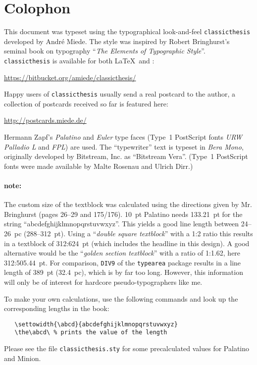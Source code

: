 \pagestyle{empty}

\hfill

\vfill


\section*{Colophon}
This document was typeset using the typographical look-and-feel \texttt{classicthesis} developed by Andr\'e Miede. 
The style was inspired by Robert Bringhurst's seminal book on typography ``\emph{The Elements of Typographic Style}''. 
\texttt{classicthesis} is available for both \LaTeX\ and \mLyX: 
\begin{center}
\url{https://bitbucket.org/amiede/classicthesis/}
\end{center}
Happy users of \texttt{classicthesis} usually send a real postcard to the author, a collection of postcards received so far is featured here: 
\begin{center}
\url{http://postcards.miede.de/}
\end{center}
 
\bigskip

\noindent\finalVersionString

Hermann Zapf's \emph{Palatino} and \emph{Euler} type faces (Type~1 PostScript fonts \emph{URW
Palladio L} and \emph{FPL}) are used. The ``typewriter'' text is typeset in \emph{Bera Mono}, 
originally developed by Bitstream, Inc. as ``Bitstream Vera''. (Type~1 PostScript fonts were made 
available by Malte Rosenau and
Ulrich Dirr.)

\paragraph{note:} The custom size of the textblock was calculated
using the directions given by Mr. Bringhurst (pages 26--29 and
175/176). 10~pt Palatino needs  133.21~pt for the string
``abcdefghijklmnopqrstuvwxyz''. This yields a good line length between
24--26~pc (288--312~pt). Using a ``\emph{double square textblock}''
with a 1:2 ratio this results in a textblock of 312:624~pt (which
includes the headline in this design). A good alternative would be the
``\emph{golden section textblock}'' with a ratio of 1:1.62, here
312:505.44~pt. For comparison, \texttt{DIV9} of the \texttt{typearea}
package results in a line length of 389~pt (32.4~pc), which is by far
too long. However, this information will only be of interest for
hardcore pseudo-typographers like me.%

To make your own calculations, use the following commands and look up
the corresponding lengths in the book:
\begin{verbatim}
   \settowidth{\abcd}{abcdefghijklmnopqrstuvwxyz}
   \the\abcd\ % prints the value of the length
\end{verbatim}
Please see the file \texttt{classicthesis.sty} for some precalculated 
values for Palatino and Minion.

   \settowidth{\abcd}{abcdefghijklmnopqrstuvwxyz}
   \the\abcd\ %




